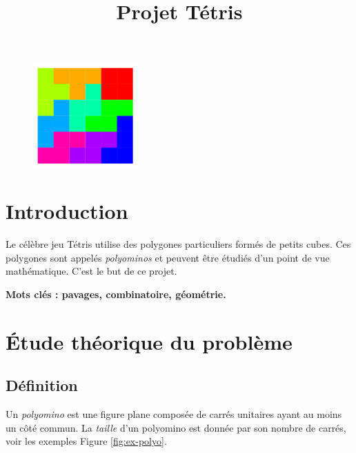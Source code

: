 \documentclass{../ficheTDTP}
\title{Projet Tétris}
\begin{document}
\maketitle

\begin{figure}[h]
\vspace{-5mm}
	\begin{center}
            \includegraphics[width=4cm]{tetris.png}
        \end{center}
	
\end{figure}

\section*{Introduction}

Le célèbre jeu Tétris utilise des polygones particuliers formés de petits cubes. Ces polygones sont appelés \emph{polyominos} et peuvent être étudiés d'un point de vue mathématique. C'est le but de ce projet.

\textbf{Mots clés : pavages, combinatoire, géométrie.}



\section{\'Etude théorique du problème}

\subsection{Définition}

Un \emph{polyomino} est une figure plane composée de carrés unitaires ayant au moins un côté commun. La \emph{taille} d'un polyomino est donnée par son nombre de carrés, voir les exemples Figure \ref{fig:ex-polyo}.
\end{document}

